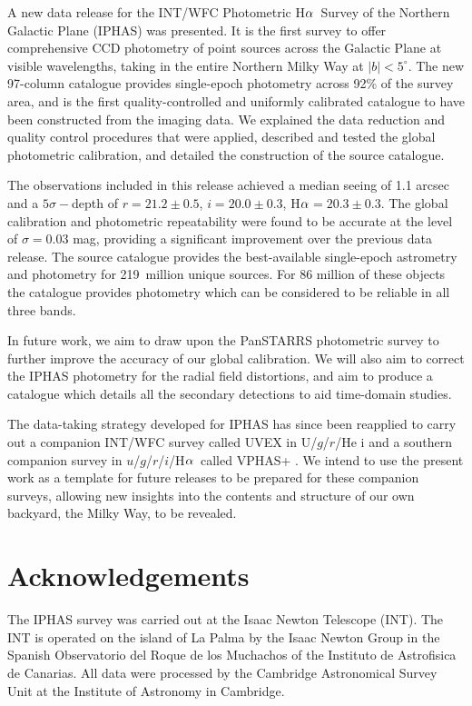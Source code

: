 \documentclass[useAMS,usenatbib]{mn2e}
\def\ha{\mbox{H$\rm \alpha$}}
\begin{document}
A new data release for the INT/WFC Photometric \ha\ Survey
of the Northern Galactic Plane (IPHAS) was presented.
It is the first survey to offer comprehensive CCD photometry
of point sources across the Galactic Plane at visible wavelengths,
taking in the entire Northern Milky Way at $|b|<5^\circ$.
The new 97-column catalogue provides single-epoch photometry
across 92\% of the survey area,
and is the first quality-controlled and uniformly calibrated
catalogue to have been constructed from the imaging data.
We explained the data reduction and quality control procedures that
were applied,
described and tested the global photometric calibration,
and detailed the construction of the source catalogue.

The observations included in this release
achieved a median seeing of 1.1 arcsec
and a $5\sigma-$depth of $r=21.2\pm 0.5$, $i=20.0\pm 0.3$, \ha$=20.3\pm 0.3$.
The global calibration and photometric repeatability
were found to be accurate at the level of $\sigma=0.03$ mag,
providing a significant improvement over the 
previous data release.
The source catalogue provides the best-available
single-epoch astrometry and photometry
for 219~million unique sources.
For 86 million of these objects the catalogue
provides photometry which can be considered to be reliable
in all three bands.

In future work, we aim to draw upon the PanSTARRS photometric
survey to further improve the accuracy of our global calibration.
We will also aim to correct the IPHAS photometry for the
radial field distortions,
and aim to produce a catalogue
which details all the secondary detections
to aid time-domain studies.

The data-taking strategy developed for IPHAS
has since been reapplied to carry out a companion INT/WFC survey called UVEX
in U/$g$/$r$/He {\sc i} \citep{Groot2009}
and a southern companion survey in $u$/$g$/$r$/$i$/\ha\ 
called VPHAS+ \citep{Drew2014}.
We intend to use the present work
as a template for future releases
to be prepared for these companion surveys,
allowing new insights into the contents and structure 
of our own backyard, the Milky Way, to be revealed. 

\section*{Acknowledgements}

The IPHAS survey was carried out 
at the Isaac Newton Telescope (INT).
The INT is operated on the island of La Palma
by the Isaac Newton Group
in the Spanish Observatorio del Roque de los Muchachos
of the Instituto de Astrofisica de Canarias.
All data were processed 
by the Cambridge Astronomical Survey Unit
at the Institute of Astronomy in Cambridge.
\end{document}
